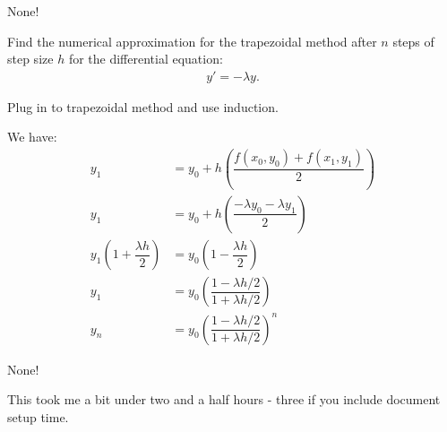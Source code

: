 \documentclass[11pt]{article}
\begin{document}
        \begin{remark}[Footnotes.]
            None!
        \end{remark}
    \newpage \setcounter{equation}{-1} \begin{problem} [Problem 6b]
        Find the numerical approximation for the trapezoidal method after $n$ steps of step size $h$ for the differential equation:
        \begin{align}
            y' = - \lambda y.
        \end{align}
    \end{problem}
        \begin{remark}[Method.]
            Plug in to trapezoidal method and use induction.
        \end{remark}
        \begin{solution}[Solution 6b]
            We have:
            \begin{align}
                y_1 &= y_0 + h\left(\dfrac{f(x_0,y_0) + f(x_1,y_1)}{2}\right) \\
                y_1 &= y_0 + h\left(\dfrac{-\lambda y_0 -\lambda y_1}{2}\right) \\
                y_1\left(1 + \dfrac{\lambda h}{2}\right) &= y_0\left(1 - \dfrac{\lambda h}{2}\right) \\
                y_1 &= y_0 \left(\dfrac{1-\lambda h/2}{1+\lambda h/2} \right) \\
                y_n &= y_0 \left(\dfrac{1-\lambda h/2}{1+\lambda h/2} \right)^n
            \end{align}
        \end{solution}
        \begin{remark}[Footnotes.]
            None!
        \end{remark}
        \newpage 
        This took me a bit under two and a half hours - three if you include document setup time.
\end{document}

